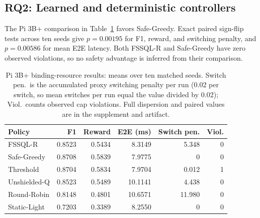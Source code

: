 \documentclass[journal]{IEEEtran}
\begin{document}
\subsection{RQ2: Learned and deterministic controllers}
The Pi 3B+ comparison in Table~\ref{tab:pi3} favors Safe-Greedy. Exact paired sign-flip tests across ten seeds give $p=0.00195$ for F1, reward, and switching penalty, and $p=0.00586$ for mean E2E latency. Both FSSQL-R and Safe-Greedy have zero observed violations, so no safety advantage is inferred from their comparison.
\begin{table}[t]
\caption{Pi 3B+ binding-resource results: means over ten matched seeds. Switch pen.\ is the accumulated proxy switching penalty per run (0.02 per switch, so mean switches per run equal the value divided by 0.02); Viol.\ counts observed cap violations. Full dispersion and paired values are in the supplement and artifact.}
\label{tab:pi3}\centering\scriptsize
\begin{tabular}{lrrrrr}\toprule
Policy & F1 & Reward & E2E (ms) & Switch pen. & Viol. \\\midrule
FSSQL-R & 0.8523 & 0.5434 & 8.3149 & 5.348 & 0 \\
Safe-Greedy & 0.8708 & 0.5839 & 7.9775 & 0 & 0 \\
Threshold & 0.8704 & 0.5834 & 7.9704 & 0.012 & 1 \\
Unshielded-Q & 0.8523 & 0.5489 & 10.1141 & 4.438 & 0 \\
Round-Robin & 0.8148 & 0.4801 & 10.6571 & 11.980 & 0 \\
Static-Light & 0.7203 & 0.3389 & 8.2550 & 0 & 0 \\\bottomrule
\end{tabular}\end{table}
\end{document}

